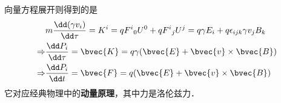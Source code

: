 向量方程展开则得到的是
\begin{equation}
\begin{aligned}
&m\frac{\dd (\gamma v_i)}{\dd \tau} =K^i=q{F^i}_0U^0+q{F^i}_jU^j=q\gamma E_i+q\epsilon_{ijk} \gamma v_j B_k
\\
\Rightarrow &\frac{\dd P_i}{\dd \tau}=\bvec{K}=q\gamma(\bvec{E}+\bvec{v}\times\bvec{B})\\
\Rightarrow &\frac{\dd P_i}{\dd t}=\bvec{F}=q(\bvec{E}+\bvec{v}\times\bvec{B})
\end{aligned}
\end{equation}
它对应经典物理中的\textbf{动量原理}，其中力是洛伦兹力．






